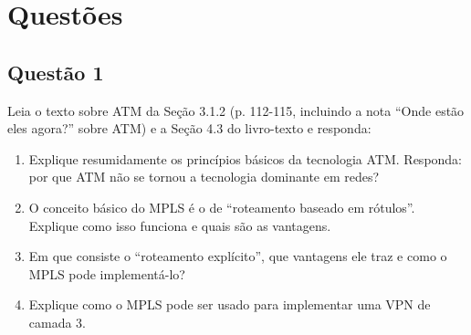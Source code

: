\section{Questões}\label{sec:questoes}


\subsection{Questão 1}
Leia o texto sobre ATM da Seção 3.1.2 (p. 112-115, incluindo a nota
“Onde estão eles agora?” sobre ATM) e a Seção 4.3 do livro-texto e responda:


\begin{enumerate}[label=\alph*.]
    \item Explique resumidamente os princípios básicos da tecnologia ATM. Responda: por
que ATM não se tornou a tecnologia dominante em redes?
    \item O conceito básico do MPLS é o de “roteamento baseado em rótulos”. Explique
como isso funciona e quais são as vantagens.
    \item  Em que consiste o “roteamento explícito”, que vantagens ele traz e como o
MPLS pode implementá-lo?
    \item Explique como o MPLS pode ser usado para implementar uma VPN de camada 3.
\end{enumerate}

